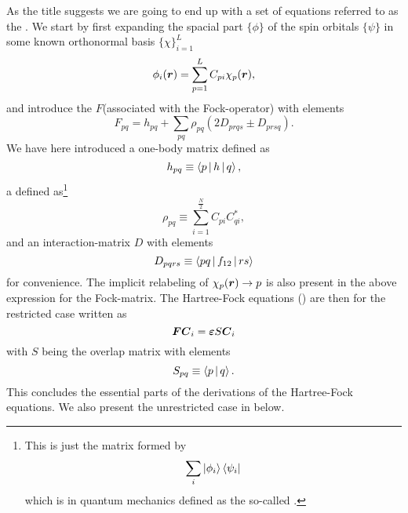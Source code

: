         As the title suggests we are going to end up with a set of equations
        referred to as the . We start by first
        expanding the spacial part $\{\phi\}$ of the spin orbitals $\{\psi\}$
        in some known orthonormal basis $\{\chi\}^L_{i=1}$
            \begin{equation}
                \phi_i(\boldsymbol{{r}}) = \sum\limits^L_{p=1} C_{pi}\chi_p(\boldsymbol{{r}}),
                \label{eq:HFexpansiondephi}
            \end{equation}
        and introduce the  $F$(associated with the
        Fock-operator) with elements
            \begin{equation}
                F_{pq} = h_{pq} + \sum_{pq}\rho_{pq}\left(2D_{prqs} \pm
                D_{prsq}\right).
                \label{eq:FockRestrictedDef}
            \end{equation}
        We have here introduced a one-body matrix defined as
            \begin{equation}
                h_{pq} \equiv \Braket{p | h | q},
            \end{equation}
        a  defined
        as\footnote{This is just the matrix formed by \begin{equation}
        \sum_i\ket{\phi_i}\bra{\psi_i}\end{equation} which is in quantum
        mechanics defined as the so-called .}
            \begin{equation}
                \rho_{pq} \equiv \sum\limits^{\frac{N}{2}}_{i=1}
                C_{pi}C^{*}_{qi},
                \label{eq:densitymatrixdef}
            \end{equation}
        and an interaction-matrix $D$ with elements
            \begin{equation}
                D_{pqrs} \equiv \Braket{pq | f_{12} | rs}
            \end{equation}
        for convenience. The implicit relabeling of $\chi_p(\boldsymbol{{r}})\rightarrow p$
        is also present in the above expression for the Fock-matrix. The
        Hartree-Fock equations () are then for the
        restricted case written as
            \begin{equation}
                \boldsymbol{{F}}\boldsymbol{{C}}_i = \boldsymbol{{\varepsilon}}S\boldsymbol{{C}}_i
                \label{eq:eigvalrestr}
            \end{equation}
        with $S$ being the overlap matrix with elements
            \begin{equation}
                S_{pq} \equiv \Braket{p | q}.
            \end{equation}
        This concludes the essential parts of the derivations of the
        Hartree-Fock equations. We also present the unrestricted case in
         below. 
    
